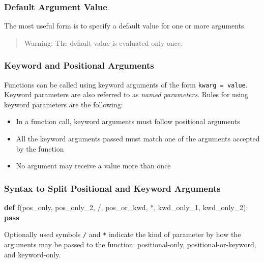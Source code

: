 \documentclass[
]{article}
\newenvironment{Shaded}{}{}
\newcommand{\ControlFlowTok}[1]{\textcolor[rgb]{0.00,0.44,0.13}{\textbf{#1}}}
\newcommand{\KeywordTok}[1]{\textcolor[rgb]{0.00,0.44,0.13}{\textbf{#1}}}
\newcommand{\NormalTok}[1]{#1}
\newcommand{\OperatorTok}[1]{\textcolor[rgb]{0.40,0.40,0.40}{#1}}
\begin{document}
\hypertarget{default-argument-value}{%
\subsubsection{Default Argument Value}\label{default-argument-value}}

The most useful form is to specify a default value for one or more
arguments.

\begin{quote}
Warning: The default value is evaluated only once.
\end{quote}

\hypertarget{keyword-and-positional-arguments}{%
\subsubsection{Keyword and Positional
Arguments}\label{keyword-and-positional-arguments}}

Functions can be called using keyword arguments of the form
\texttt{kwarg\ =\ value}. Keyword parameters are also referred to as
\emph{named parameters}. Rules for using keyword parameters are the
following:

\begin{itemize}
\item
  In a function call, keyword arguments must follow positional arguments
\item
  All the keyword arguments passed must match one of the arguments
  accepted by the function
\item
  No argument may receive a value more than once
\end{itemize}

\hypertarget{syntax-to-split-positional-and-keyword-arguments}{%
\subsubsection{Syntax to Split Positional and Keyword
Arguments}\label{syntax-to-split-positional-and-keyword-arguments}}

\begin{Shaded}
\begin{Highlighting}[]
\KeywordTok{def}\NormalTok{ f(pos\_only, pos\_only\_2, }\OperatorTok{/}\NormalTok{, pos\_or\_kwd, }\OperatorTok{*}\NormalTok{, kwd\_only\_1, kwd\_only\_2):}
    \ControlFlowTok{pass}
\end{Highlighting}
\end{Shaded}

Optionally used symbols \texttt{/} and \texttt{*} indicate the kind of
parameter by how the arguments may be passed to the function:
positional-only, positional-or-keyword, and keyword-only.
\end{document}
